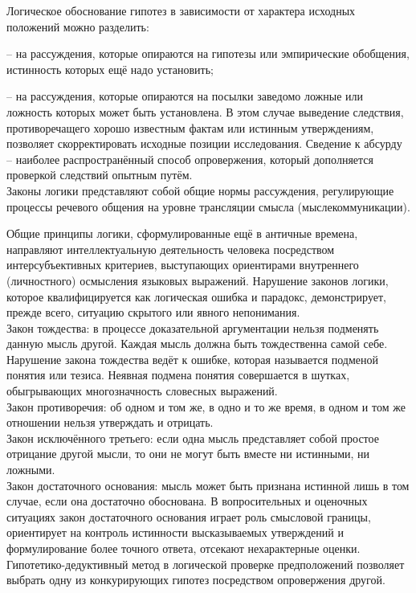 \documentclass[exam_answers.tex]{subfiles}
\begin{document}
\renewcommand{\baselinestretch}{0.75}

Логическое обоснование гипотез в зависимости от характера исходных положений можно разделить:

-- на рассуждения, которые опираются на гипотезы или эмпирические обобщения, истинность которых ещё надо установить;

-- на рассуждения, которые опираются на посылки заведомо ложные или ложность которых может быть установлена.
В этом случае выведение следствия, противоречащего хорошо известным фактам или истинным утверждениям, позволяет скорректировать исходные позиции исследования.
Сведение к абсурду – наиболее распространённый способ опровержения, который дополняется проверкой следствий опытным путём.
\\

Законы логики представляют собой общие нормы рассуждения, регулирующие процессы речевого общения на уровне трансляции смысла (мыслекоммуникации).

Общие принципы логики, сформулированные ещё в античные времена, направляют интеллектуальную деятельность человека посредством интерсубъективных критериев, выступающих ориентирами внутреннего (личностного) осмысления языковых выражений.
Нарушение законов логики, которое квалифицируется как логическая ошибка и парадокс, демонстрирует, прежде всего, ситуацию скрытого или явного непонимания.
\\

Закон тождества: в процессе доказательной аргументации нельзя подменять данную мысль другой.
Каждая мысль должна быть тождественна самой себе.
Нарушение закона тождества ведёт к ошибке, которая называется подменой понятия или тезиса.
Неявная подмена понятия совершается в шутках, обыгрывающих многозначность словесных выражений.
\\

Закон противоречия: об одном и том же, в одно и то же время, в одном и том же отношении нельзя утверждать и отрицать.
\\

Закон исключённого третьего: если одна мысль представляет собой простое отрицание другой мысли, то они не могут быть вместе ни истинными, ни ложными.
\\

Закон достаточного основания: мысль может быть признана истинной лишь в том случае, если она достаточно обоснована.
В вопросительных и оценочных ситуациях закон достаточного основания играет роль смысловой границы, ориентирует на контроль истинности высказываемых утверждений и формулирование более точного ответа, отсекают нехарактерные оценки.
\\

Гипотетико-дедуктивный метод в логической проверке предположений позволяет выбрать одну из конкурирующих гипотез посредством опровержения другой.
\end{document}
